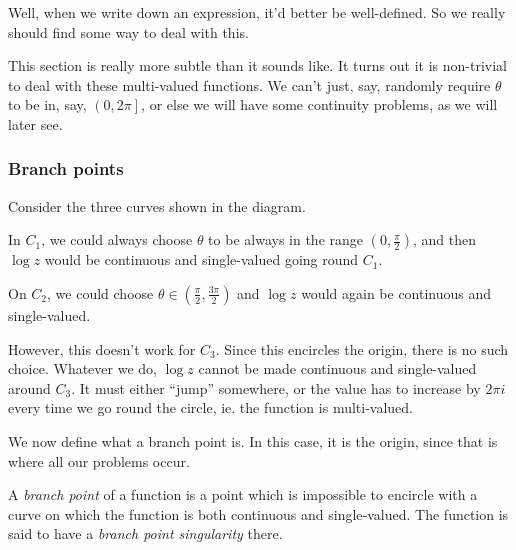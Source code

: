 \documentclass[a4paper]{article}
\begin{document}
Well, when we write down an expression, it'd better be well-defined. So we really should find some way to deal with this.

This section is really more subtle than it sounds like. It turns out it is non-trivial to deal with these multi-valued functions. We can't just, say, randomly require $\theta$ to be in, say, $\left(0, 2\pi\right]$, or else we will have some continuity problems, as we will later see.

\subsubsection*{Branch points}
Consider the three curves shown in the diagram.
\begin{center}
\end{center}
In $C_1$, we could always choose $\theta$ to be always in the range $\left(0, \frac{\pi}{2}\right)$, and then $\log z$ would be continuous and single-valued going round $C_1$.

On $C_2$, we could choose $\theta \in \left(\frac{\pi}{2}, \frac{3\pi}{2}\right)$ and $\log z$ would again be continuous and single-valued.

However, this doesn't work for $C_3$. Since this encircles the origin, there is no such choice. Whatever we do, $\log z$ cannot be made continuous and single-valued around $C_3$. It must either ``jump'' somewhere, or the value has to increase by $2\pi i$ every time we go round the circle, ie. the function is multi-valued.

We now define what a branch point is. In this case, it is the origin, since that is where all our problems occur.
\begin{defi}
  A \emph{branch point} of a function is a point which is impossible to encircle with a curve on which the function is both continuous and single-valued. The function is said to have a \emph{branch point singularity} there.
\end{defi}
\end{document}
